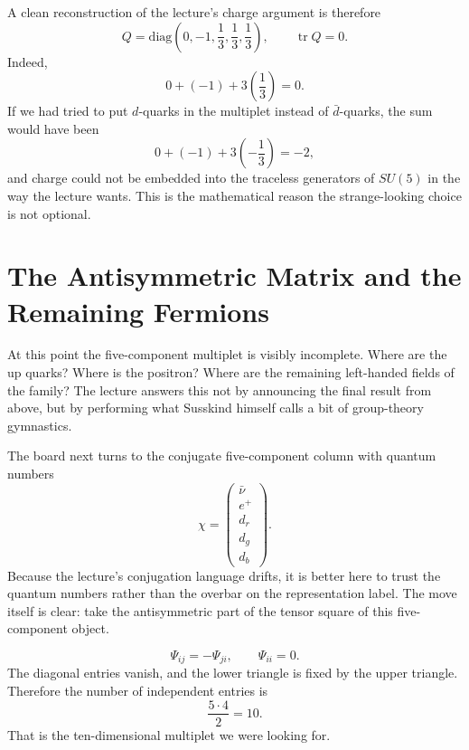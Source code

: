 A clean reconstruction of the lecture's charge argument is therefore
\begin{equation}
Q=\mathrm{diag}\!\left(0,-1,\frac13,\frac13,\frac13\right),
\qquad
\operatorname{tr}Q=0.
\end{equation}
Indeed,
\begin{equation}
0+(-1)+3\left(\frac13\right)=0.
\end{equation}
If we had tried to put \(d\)-quarks in the multiplet instead of \(\bar d\)-quarks, the sum would have been
\[
0+(-1)+3\left(-\frac13\right)=-2,
\]
and charge could not be embedded into the traceless generators of \(SU(5)\) in the way the lecture wants. This is the mathematical reason the strange-looking choice is not optional.

\section{The Antisymmetric Matrix and the Remaining Fermions}

At this point the five-component multiplet is visibly incomplete. Where are the up quarks? Where is the positron? Where are the remaining left-handed fields of the family? The lecture answers this not by announcing the final result from above, but by performing what Susskind himself calls a bit of group-theory gymnastics.

The board next turns to the conjugate five-component column with quantum numbers
\begin{equation}
\chi=
\begin{pmatrix}
\bar\nu\\
e^+\\
d_r\\
d_g\\
d_b
\end{pmatrix}.
\end{equation}
Because the lecture's conjugation language drifts, it is better here to trust the quantum numbers rather than the overbar on the representation label. The move itself is clear: take the antisymmetric part of the tensor square of this five-component object.

\begin{equation}
\Psi_{ij}=-\Psi_{ji},
\qquad
\Psi_{ii}=0.
\end{equation}
The diagonal entries vanish, and the lower triangle is fixed by the upper triangle. Therefore the number of independent entries is
\begin{equation}
\frac{5\cdot 4}{2}=10.
\end{equation}
That is the ten-dimensional multiplet we were looking for.

